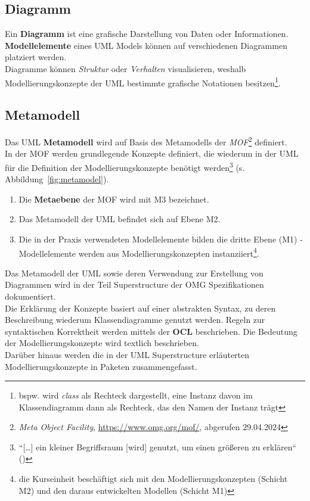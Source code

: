 \subsection*{Diagramm}
Ein \textbf{Diagramm} ist eine grafische Darstellung von Daten oder Informationen.\\
\textbf{Modellelemente} eines UML Models können auf verschiedenen Diagrammen platziert werden.\\
Diagramme können \textit{Struktur} oder \textit{Verhalten} visualisieren, weshalb Modellierungskonzepte der UML bestimmte grafische Notationen besitzen\footnote{
bspw. wird \textit{class} als Rechteck dargestellt, eine Instanz davon im Klassendiagramm dann als Rechteck, das den Namen der Instanz trägt
}.

\subsection*{Metamodell}
Das UML \textbf{Metamodell} wird auf Basis des Metamodells der \textit{MOF}\footnote{
\textit{Meta Object Facility}, \url{https://www.omg.org/mof/}, abgerufen 29.04.2024
} definiert.\\
In der MOF werden grundlegende Konzepte definiert, die wiederum in der UML für die Definition der Modellierungskonzepte benötigt werden\footnote{
``[\ldots] ein kleiner Begriffsraum [wird] genutzt, um einen größeren zu erklären`` (\cite[5]{Buh09})
} (s. Abbildung~\ref{fig:metamodel}).

\begin{enumerate}
    \item Die \textbf{Metaebene} der MOF wird mit M3 bezeichnet.
    \item Das Metamodell der UML befindet sich auf Ebene M2.
    \item Die in der Praxis verwendeten Modellelemente bilden die dritte Ebene (M1) - Modellelemente werden aus Modellierungskonzepten instanziiert\footnote{
    die Kurseinheit beschäftigt sich mit den Modellierungskonzepten (Schicht M2) und den daraus entwickelten Modellen (Schicht M1)
    }.
\end{enumerate}

\noindent
Das Metamodell der UML sowie deren Verwendung zur Erstellung von Diagrammen wird in der Teil Superstructure der OMG Spezifikationen dokumentiert.\\
Die Erklärung der Konzepte basiert auf einer abstrakten Syntax, zu deren Beschreibung wiederum Klassendiagramme genutzt werden.
Regeln zur syntaktischen Korrektheit werden mittels der \textbf{OCL} beschrieben.
Die Bedeutung der Modellierungskonzepte wird textlich beschrieben.\\
Darüber hinaus werden die in der UML Superstructure erläuterten Modellierungskonzepte in Paketen zusammengefasst.

